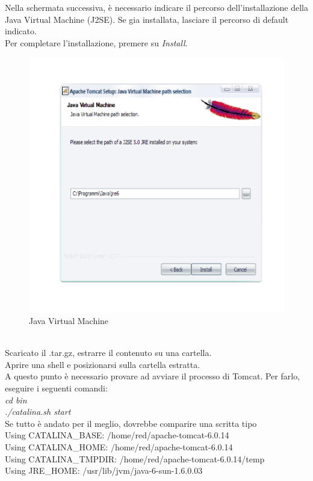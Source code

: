 Nella schermata successiva, \`e necessario indicare il percorso dell'installazione della Java Virtual Machine (J2SE). Se gia installata, lasciare il percorso di default indicato. \\
Per completare l'installazione, premere su \textit{Install}.\\

\begin{figure}[!ht]
\centering
\includegraphics[scale=0.7]{images/InstallTomcat4.png}
\caption{Java Virtual Machine}
\end{figure} 

\\

Scaricato il .tar.gz, estrarre il contenuto su una cartella. \\
Aprire una shell e posizionarsi sulla cartella estratta. \\
A questo punto \`e necessario provare ad avviare il processo di Tomcat. Per farlo, eseguire i seguenti comandi:\\
\textit{cd bin}\\
\textit{./catalina.sh start}\\

Se tutto \`e andato per il meglio, dovrebbe comparire una scritta tipo\\
Using CATALINA{\_}BASE: /home/red/apache-tomcat-6.0.14\\ 
Using CATALINA{\_}HOME: /home/red/apache-tomcat-6.0.14\\
Using CATALINA{\_}TMPDIR: /home/red/apache-tomcat-6.0.14/temp\\
Using JRE{\_}HOME: /usr/lib/jvm/java-6-sun-1.6.0.03\\

